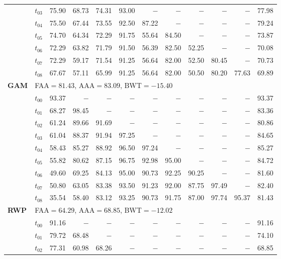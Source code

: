 \begin{table}[ht]
\begin{tabular}{@{}l l r r r r r r r r r r@{}}
 & $t_{03}$ & 75.90 & 68.73 & 74.31 & 93.00 & $-$ & $-$ & $-$ & $-$ & $-$ & 77.98 \\
 & $t_{04}$ & 75.50 & 67.44 & 73.55 & 92.50 & 87.22 & $-$ & $-$ & $-$ & $-$ & 79.24 \\
 & $t_{05}$ & 74.70 & 64.34 & 72.29 & 91.75 & 55.64 & 84.50 & $-$ & $-$ & $-$ & 73.87 \\
 & $t_{06}$ & 72.29 & 63.82 & 71.79 & 91.50 & 56.39 & 82.50 & 52.25 & $-$ & $-$ & 70.08 \\
 & $t_{07}$ & 72.29 & 59.17 & 71.54 & 91.25 & 56.64 & 82.00 & 52.50 & 80.45 & $-$ & 70.73 \\
 & $t_{08}$ & 67.67 & 57.11 & 65.99 & 91.25 & 56.64 & 82.00 & 50.50 & 80.20 & 77.63 & 69.89 \\
\midrule
\multirow{10}{*}{\textbf{GAM}} & \multicolumn{11}{l}{\quad\small FAA$=81.43$,\; AAA$=83.09$,\; BWT$=-15.40$} \\
 & $t_{00}$ & 93.37 & $-$ & $-$ & $-$ & $-$ & $-$ & $-$ & $-$ & $-$ & 93.37 \\
 & $t_{01}$ & 68.27 & 98.45 & $-$ & $-$ & $-$ & $-$ & $-$ & $-$ & $-$ & 83.36 \\
 & $t_{02}$ & 61.24 & 89.66 & 91.69 & $-$ & $-$ & $-$ & $-$ & $-$ & $-$ & 80.86 \\
 & $t_{03}$ & 61.04 & 88.37 & 91.94 & 97.25 & $-$ & $-$ & $-$ & $-$ & $-$ & 84.65 \\
 & $t_{04}$ & 58.43 & 85.27 & 88.92 & 96.50 & 97.24 & $-$ & $-$ & $-$ & $-$ & 85.27 \\
 & $t_{05}$ & 55.82 & 80.62 & 87.15 & 96.75 & 92.98 & 95.00 & $-$ & $-$ & $-$ & 84.72 \\
 & $t_{06}$ & 49.60 & 69.25 & 84.13 & 95.00 & 90.73 & 92.25 & 90.25 & $-$ & $-$ & 81.60 \\
 & $t_{07}$ & 50.80 & 63.05 & 83.38 & 93.50 & 91.23 & 92.00 & 87.75 & 97.49 & $-$ & 82.40 \\
 & $t_{08}$ & 35.54 & 58.40 & 83.12 & 93.25 & 90.73 & 91.75 & 87.00 & 97.74 & 95.37 & 81.43 \\
\midrule
\multirow{10}{*}{\textbf{RWP}} & \multicolumn{11}{l}{\quad\small FAA$=64.29$,\; AAA$=68.85$,\; BWT$=-12.02$} \\
 & $t_{00}$ & 91.16 & $-$ & $-$ & $-$ & $-$ & $-$ & $-$ & $-$ & $-$ & 91.16 \\
 & $t_{01}$ & 79.72 & 68.48 & $-$ & $-$ & $-$ & $-$ & $-$ & $-$ & $-$ & 74.10 \\
 & $t_{02}$ & 77.31 & 60.98 & 68.26 & $-$ & $-$ & $-$ & $-$ & $-$ & $-$ & 68.85 \\

\end{tabular}
\end{table}
